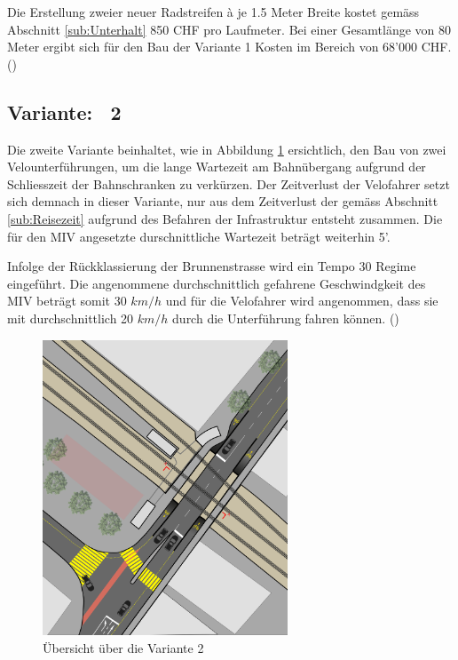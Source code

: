 Die Erstellung zweier neuer Radstreifen à je 1.5 Meter Breite kostet gemäss Abschnitt \ref{sub:Unterhalt} 850 CHF pro Laufmeter. Bei einer Gesamtlänge von 80 Meter ergibt sich für den Bau der Variante 1 Kosten im Bereich von 68'000 CHF. (\cite{Baukosten2010}) 

\pagebreak

\subsection{Variante: \ 2}
\label{subsec:V2}
	
Die zweite Variante beinhaltet, wie in Abbildung \ref{img:V2Ü} ersichtlich, den Bau von zwei Velounterführungen, um die lange Wartezeit am Bahnübergang aufgrund der Schliesszeit der Bahnschranken zu verkürzen. Der Zeitverlust der Velofahrer setzt sich demnach in dieser Variante, nur aus dem Zeitverlust der gemäss Abschnitt \ref{sub:Reisezeit} aufgrund des Befahren der Infrastruktur entsteht zusammen. Die für den MIV angesetzte durschnittliche Wartezeit beträgt weiterhin 5'. 

Infolge der Rückklassierung der Brunnenstrasse wird ein Tempo 30 Regime eingeführt. Die angenommene durchschnittlich gefahrene Geschwindgkeit des MIV beträgt somit 30 $km/h$ und für die Velofahrer wird angenommen, dass sie mit durchschnittlich 20 $km/h$ durch die Unterführung fahren können. (\cite{Mikrozensus2015})


\begin{figure}[h!]
	\centering
	\includegraphics[width=0.65\textwidth]{figures/f-04-05-02-a-V2}
	\caption[Übersicht Variante 2]{Übersicht über die Variante 2}
	\label{img:V2Ü}
\end{figure}

